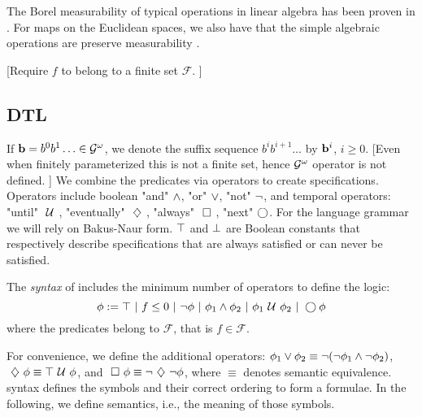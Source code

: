 \documentclass{ifacconf}
\newcommand{\red}[1]{{\color{red} #1}}
\newcommand{\Fpred}{{\mathcal F}}
\begin{document}
    The Borel measurability of typical operations in linear algebra 
   has been proven in \cite{azoff1974borel}.
For maps on the Euclidean spaces, we also have that the simple algebraic operations are preserve measurability \cite[page 116]{lang1993real}.

\red{[Require $f$ to belong to a finite set $\Fpred$. ]}
  
    \subsection{DTL}    
    If $\mathbf{b} = b^0b^1 \ldots \in \mathcal{G}^{\omega}$,
    we denote the suffix sequence $b^i b^{i+1} \ldots$ by
    $\mathbf{b}^i$, $i \geq 0$.  \red{[Even when finitely parameterized this is not a finite set, hence $\mathcal{G}^{\omega}$ operator is not defined. ]}
   We  combine the predicates via operators to create specifications. Operators include boolean "and" $\wedge$, "or" $\vee$, "not" $\neg$, and temporal operators: "until" $\ \mathcal{U}\ $, "eventually" $\ \diamondsuit\ $, "always" $\ \square\ $, "next" $\bigcirc$.
      For the language grammar we will rely on Bakus-Naur form. $\top$ and $\perp$ are Boolean constants that respectively describe specifications that are always satisfied or can never be satisfied.
    
    \begin{definition}
    \label{def:gdtl-syntax}
    The {\em syntax} of \DTL includes the minimum number of operators to define the logic:
    \begin{equation*}
     \phi :=  \top \ |\ f \leq 0 \ |\ \neg \phi \ |\ \phi_1 \wedge \phi_2 \ |\ \phi_1 \ \mathcal{U}\  \phi_2 \ |\ \bigcirc \phi
    \end{equation*} where the predicates belong to $\Fpred$, that is $f \in \Fpred$. 
    \end{definition}

    For convenience, we define the additional operators:
    $\phi_1 \vee \phi_2 \equiv  \neg (\neg \phi_1 \wedge \neg \phi_2)$,
    $\ \diamondsuit\  \phi \equiv \top \ \mathcal{U}\  \phi$, and
    $\ \square\  \phi \equiv \neg \ \diamondsuit\  \neg \phi$,
    where $\equiv$ denotes semantic equivalence. \DTL syntax defines the symbols and their correct ordering to form a formulae. In the following, we define \DTL semantics, i.e., the meaning of those symbols.
\end{document}
